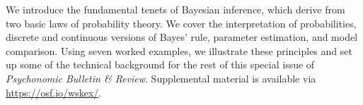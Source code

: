 We introduce the fundamental tenets of Bayesian inference, which derive from two basic laws of probability theory. We cover the interpretation of probabilities, discrete and continuous versions of Bayes' rule, parameter estimation, and model comparison. Using seven worked examples, we illustrate these principles and set up some of the technical background for the rest of this special issue of \textit{Psychonomic Bulletin \& Review}. Supplemental material is available via \url{https://osf.io/wskex/}.